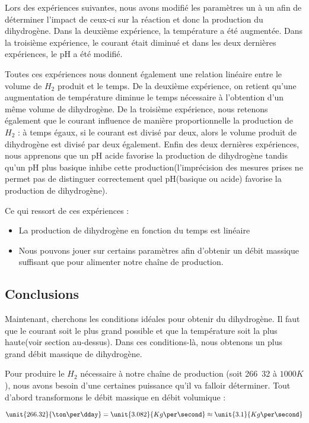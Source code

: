 Lors des expériences suivantes, nous avons modifié les paramètres un à 
un afin de déterminer l'impact de ceux-ci sur la réaction et donc la 
production du dihydrogène. Dans la deuxième expérience, la température
a été augmentée. Dans la troisième expérience, le courant était diminué
et dans les deux dernières expériences, le pH a été modifié.

Toutes ces expériences nous donnent également une relation linéaire 
entre le volume de $H_{2}$ produit et le temps. De la deuxième expérience,
on retient qu'une augmentation de température diminue le temps nécessaire 
à l'obtention d'un même volume de dihydrogène. De la troisième expérience, 
nous retenons également que le courant influence de manière proportionnelle
la production de $H_{2}$ : à temps égaux, si le courant est divisé par deux,
alors le volume produit de dihydrogène est divisé par deux également. Enfin 
des deux dernières expériences, nous apprenons que un pH acide favorise la
production de dihydrogène tandis qu'un pH plus basique inhibe cette 
production(l'imprécision des mesures prises ne permet pas de distinguer 
correctement quel pH(basique ou acide) favorise la production de dihydrogène).

Ce qui ressort de ces expériences :

\begin{itemize}
	\item La production de dihydrogène en fonction du temps est linéaire
	\item Nous pouvons jouer sur certains paramètres afin d'obtenir un débit
	massique suffisant que pour alimenter notre chaîne de production.
\end{itemize}

\subsection{Conclusions}
Maintenant, cherchons les conditions idéales pour obtenir du dihydrogène.
Il faut que le courant soit le plus grand possible et que la température
soit la plus haute(voir section au-dessus). Dans ces conditions-là, nous
obtenons un plus grand débit massique de dihydrogène.

Pour produire le $H_{2}$ nécessaire à notre chaîne de production 
(soit \unit{266.32}{\ton\per\dday} à $1000K$), nous avons besoin d'une 
certaines puissance qu'il va falloir déterminer. Tout d'abord transformons 
le débit massique en débit volumique :

$$\unit{266.32}{\ton\per\dday} = \unit{3.082}{Kg\per\second} \approx \unit{3.1}{Kg\per\second}$$

